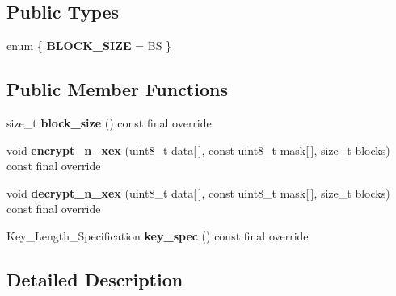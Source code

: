 \subsection*{Public Types}
\begin{DoxyCompactItemize}
\item 
\mbox{\label{class_botan_1_1_block___cipher___fixed___params_acf09ca1f26b5301907fadb78fb398912}} 
enum \{ {\bfseries B\+L\+O\+C\+K\+\_\+\+S\+I\+ZE} = BS
 \}
\end{DoxyCompactItemize}
\subsection*{Public Member Functions}
\begin{DoxyCompactItemize}
\item 
\mbox{\label{class_botan_1_1_block___cipher___fixed___params_aa9c361c59f811145a1606c46cf379676}} 
size\+\_\+t {\bfseries block\+\_\+size} () const final override
\item 
\mbox{\label{class_botan_1_1_block___cipher___fixed___params_a5d9a4c02ac74524e9d5de015d245b65c}} 
void {\bfseries encrypt\+\_\+n\+\_\+xex} (uint8\+\_\+t data\mbox{[}$\,$\mbox{]}, const uint8\+\_\+t mask\mbox{[}$\,$\mbox{]}, size\+\_\+t blocks) const final override
\item 
\mbox{\label{class_botan_1_1_block___cipher___fixed___params_afc72841501e733feef50c6bcedb4d0a6}} 
void {\bfseries decrypt\+\_\+n\+\_\+xex} (uint8\+\_\+t data\mbox{[}$\,$\mbox{]}, const uint8\+\_\+t mask\mbox{[}$\,$\mbox{]}, size\+\_\+t blocks) const final override
\item 
\mbox{\label{class_botan_1_1_block___cipher___fixed___params_a38b9617389d66c27198fb6c247da453a}} 
Key\+\_\+\+Length\+\_\+\+Specification {\bfseries key\+\_\+spec} () const final override
\end{DoxyCompactItemize}


\subsection{Detailed Description}
